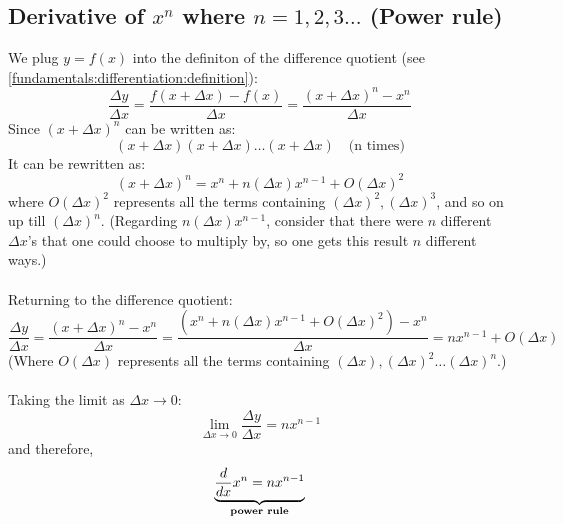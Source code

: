 \documentclass{report}
\begin{document}
\subsection{Derivative of $x^n$ where $n=1,2,3\ldots$ (Power rule)} %
We plug $y=f(x)$ into the definiton of the difference quotient 
(see \ref{fundamentals:differentiation:definition}):
\begin{equation*}
\frac{\Delta y}{\Delta x}=\frac{f(x+\Delta x)-f(x)}{\Delta x}=\frac{(x+\Delta x)^n-x^n}{\Delta x}
\end{equation*}
Since $(x+\Delta x)^n$ can be written as:
\begin{equation*}
(x+\Delta x)(x+\Delta x)\ldots (x+\Delta x)\quad\text{(n times)}
\end{equation*}
It can be rewritten as:
\begin{equation*}
(x+\Delta x)^n=x^n+n(\Delta x)x^{n-1}+O(\Delta x)^2
\end{equation*}
where $O(\Delta x)^2$ represents all the terms containing  $(\Delta x)^2, (\Delta x)^3$, and so on
up till $(\Delta x)^n$. (Regarding $n(\Delta x)x^{n-1}$, consider that there were $n$ different
$\Delta x$'s that one could choose to multiply by, so one gets this result $n$ different ways.)\\
\vspace{2mm}\\
Returning to the difference quotient:
\begin{equation*}
\frac{\Delta y}{\Delta x}=\frac{(x+\Delta x)^n-x^n}{\Delta x}
=\frac{(x^n+n(\Delta x)x^{n-1}+O(\Delta x)^2)-x^n}{\Delta x}
=nx^{n-1}+O(\Delta x)
\end{equation*}
(Where $O(\Delta x)$ represents all the terms containing  $(\Delta x), (\Delta x)^2
\ldots(\Delta x)^n$.)\\
\vspace{2mm}\\
Taking the limit as $\Delta x\to 0$:
\begin{equation*}
\lim_{\Delta x\to 0}\frac{\Delta y}{\Delta x}=nx^{n-1}
\end{equation*}
and therefore,
\begin{equation*}
\underbrace{\frac{d}{dx}x^n=nx^{n-1}}_{\text{\textbf{power rule}}}
\end{equation*}
\newpage
\end{document}
